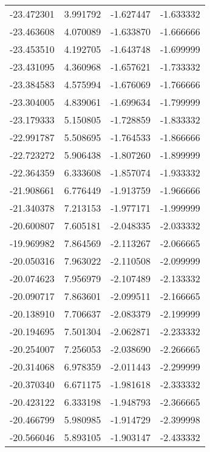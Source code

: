 \begin{tabular}{rrrr}
      -23.472301 &         3.991792 &   -1.627447 &  -1.633332 \\
      -23.463608 &         4.070089 &   -1.633870 &  -1.666666 \\
      -23.453510 &         4.192705 &   -1.643748 &  -1.699999 \\
      -23.431095 &         4.360968 &   -1.657621 &  -1.733332 \\
      -23.384583 &         4.575994 &   -1.676069 &  -1.766666 \\
      -23.304005 &         4.839061 &   -1.699634 &  -1.799999 \\
      -23.179333 &         5.150805 &   -1.728859 &  -1.833332 \\
      -22.991787 &         5.508695 &   -1.764533 &  -1.866666 \\
      -22.723272 &         5.906438 &   -1.807260 &  -1.899999 \\
      -22.364359 &         6.333608 &   -1.857074 &  -1.933332 \\
      -21.908661 &         6.776449 &   -1.913759 &  -1.966666 \\
      -21.340378 &         7.213153 &   -1.977171 &  -1.999999 \\
      -20.600807 &         7.605181 &   -2.048335 &  -2.033332 \\
      -19.969982 &         7.864569 &   -2.113267 &  -2.066665 \\
      -20.050316 &         7.963022 &   -2.110508 &  -2.099999 \\
      -20.074623 &         7.956979 &   -2.107489 &  -2.133332 \\
      -20.090717 &         7.863601 &   -2.099511 &  -2.166665 \\
      -20.138910 &         7.706637 &   -2.083379 &  -2.199999 \\
      -20.194695 &         7.501304 &   -2.062871 &  -2.233332 \\
      -20.254007 &         7.256053 &   -2.038690 &  -2.266665 \\
      -20.314068 &         6.978359 &   -2.011443 &  -2.299999 \\
      -20.370340 &         6.671175 &   -1.981618 &  -2.333332 \\
      -20.423122 &         6.333198 &   -1.948793 &  -2.366665 \\
      -20.466799 &         5.980985 &   -1.914729 &  -2.399998 \\
      -20.566046 &         5.893105 &   -1.903147 &  -2.433332 \\

\end{tabular}
